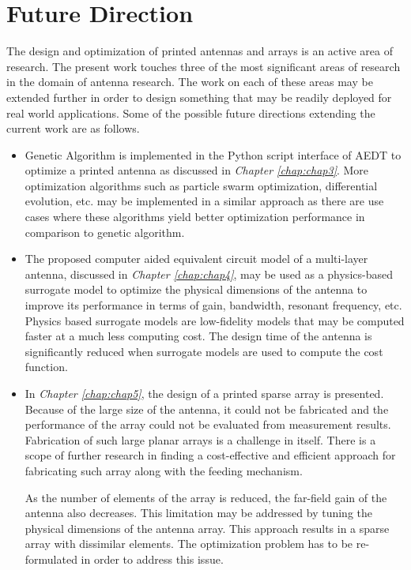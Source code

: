\section{Future Direction}\label{c6sec_future}
The design and optimization of printed antennas and arrays is an active area of research. The present work touches three of the most significant areas of research in the domain of antenna research. The work on each of these areas may be extended further in order to design something that may be readily deployed for real world applications. Some of the possible future directions extending the current work are as follows.
\begin{itemize}
\item Genetic Algorithm is implemented in the Python script interface of AEDT to optimize a printed antenna as discussed in \emph{Chapter \ref{chap:chap3}}. More optimization algorithms such as particle swarm optimization, differential evolution, etc. may be implemented in a similar approach as there are use cases where these algorithms yield better optimization performance in comparison to genetic algorithm.
\item The proposed computer aided equivalent circuit model of a multi-layer antenna, discussed in \emph{Chapter \ref{chap:chap4}}, may be used as a physics-based surrogate model to optimize the physical dimensions of the antenna to improve its performance in terms of gain, bandwidth, resonant frequency, etc. Physics based surrogate models are low-fidelity models that may be computed faster at a much less computing cost. The design time of the antenna is significantly reduced when surrogate models are used to compute the cost function.
\item In  \emph{Chapter \ref{chap:chap5}}, the design of a printed sparse array is presented. Because of the large size of the antenna, it could not be fabricated and the performance of the array could not be evaluated from measurement results. Fabrication of such large planar arrays is a challenge in itself. There is a scope of further research in finding a cost-effective and efficient approach for fabricating such array along with the feeding mechanism.

    As the number of elements of the array is reduced, the far-field gain of the antenna also decreases. This limitation may be addressed by tuning the physical dimensions of the antenna array. This approach results in a sparse array with dissimilar elements. The optimization problem has to be re-formulated in order to address this issue.
\end{itemize} 